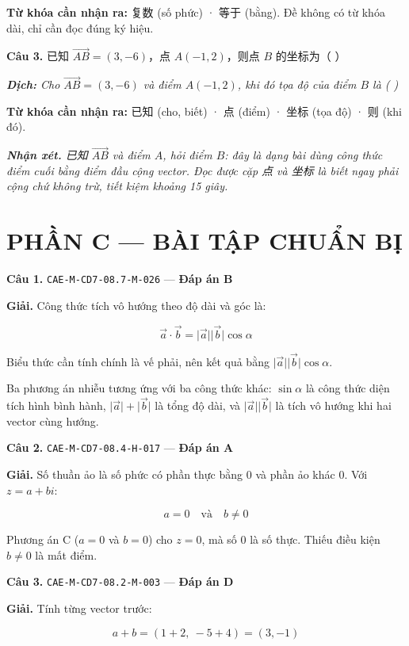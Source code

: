 \documentclass[11pt, a4paper]{article}
\begin{document}
\textbf{Từ khóa cần nhận ra:} 复数 (số phức) · 等于 (bằng). Đề không có từ khóa dài, chỉ cần đọc đúng ký hiệu.

\textbf{Câu 3.} 已知 $\overrightarrow{AB}=(3,-6)$，点 $A(-1,2)$，则点 $B$ 的坐标为（ ）

\noindent\emph{\textbf{Dịch:} Cho $\overrightarrow{AB} = (3,-6)$ và điểm $A(-1,2)$, khi đó tọa độ của điểm $B$ là ( )}

\textbf{Từ khóa cần nhận ra:} 已知 (cho, biết) · 点 (điểm) · 坐标 (tọa độ) · 则 (khi đó).

\noindent\emph{\textbf{Nhận xét.} 已知 $\overrightarrow{AB}$ và điểm $A$, hỏi điểm $B$: đây là dạng bài dùng công thức điểm cuối bằng điểm đầu cộng vector. Đọc được cặp 点 và 坐标 là biết ngay phải cộng chứ không trừ, tiết kiệm khoảng 15 giây.}

\section{PHẦN C — BÀI TẬP CHUẨN BỊ}

\textbf{Câu 1.} \texttt{CAE-M-CD7-08.7-M-026} — \textbf{Đáp án B}

\textbf{Giải.} Công thức tích vô hướng theo độ dài và góc là:

$$\vec{a} \cdot \vec{b} = \lvert\vec{a}\rvert\lvert\vec{b}\rvert\cos\alpha$$

Biểu thức cần tính chính là vế phải, nên kết quả bằng $\lvert\vec{a}\rvert\lvert\vec{b}\rvert\cos\alpha$.

 Ba phương án nhiễu tương ứng với ba công thức khác: $\sin\alpha$ là công thức diện tích hình bình hành, $\lvert\vec{a}\rvert + \lvert\vec{b}\rvert$ là tổng độ dài, và $\lvert\vec{a}\rvert\lvert\vec{b}\rvert$ là tích vô hướng khi hai vector cùng hướng.

\textbf{Câu 2.} \texttt{CAE-M-CD7-08.4-H-017} — \textbf{Đáp án A}

\textbf{Giải.} Số thuần ảo là số phức có phần thực bằng $0$ và phần ảo khác $0$. Với $z = a + bi$:

$$a = 0 \quad \text{và} \quad b \ne 0$$

 Phương án C ($a = 0$ và $b = 0$) cho $z = 0$, mà số $0$ là số thực. Thiếu điều kiện $b \ne 0$ là mất điểm.

\textbf{Câu 3.} \texttt{CAE-M-CD7-08.2-M-003} — \textbf{Đáp án D}

\textbf{Giải.} Tính từng vector trước:

$$a + b = (1 + 2,\ -5 + 4) = (3, -1)$$
\end{document}
